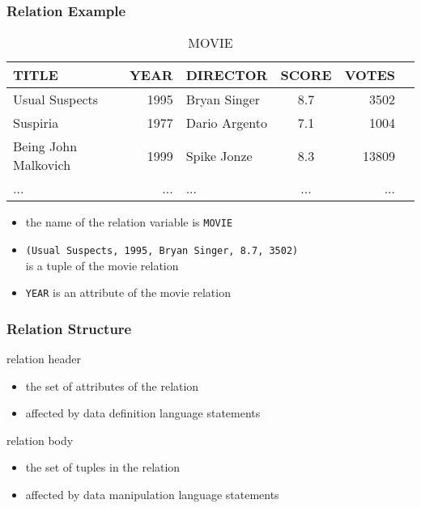 \documentclass[dvipsnames]{beamer}
\theoremstyle{plain}
\begin{document}
\begin{frame}
  \frametitle{Relation Example}

  \begin{example}
    \begin{tiny}
    \begin{table}
      \caption{MOVIE}
      \begin{tabular}{|l|r|l|c|r|r|}\hline
TITLE                & YEAR & DIRECTOR      & SCORE & VOTES\\\hline\hline
Usual Suspects       & 1995 & Bryan Singer  &   8.7 &  3502\\\hline
Suspiria             & 1977 & Dario Argento &   7.1 &  1004\\\hline
Being John Malkovich & 1999 & Spike Jonze   &   8.3 & 13809\\\hline
...                  &  ... & ...           &   ... &   ...\\\hline
      \end{tabular}
    \end{table}
    \end{tiny}

    \begin{itemize}
      \item the name of the relation variable is \texttt{MOVIE}
      \item \texttt{(Usual Suspects, 1995, Bryan Singer, 8.7, 3502)}\\
        is a tuple of the movie relation
      \item \texttt{YEAR} is an attribute of the movie relation
    \end{itemize}
  \end{example}
\end{frame}

\begin{frame}
  \frametitle{Relation Structure}

  \begin{block}{relation header}
    \begin{itemize}
      \item the set of attributes of the relation
      \item affected by data definition language statements
    \end{itemize}
  \end{block}

  \pause
  \begin{block}{relation body}
    \begin{itemize}
      \item the set of tuples in the relation
      \item affected by data manipulation language statements
    \end{itemize}
  \end{block}
\end{frame}
\end{document}
